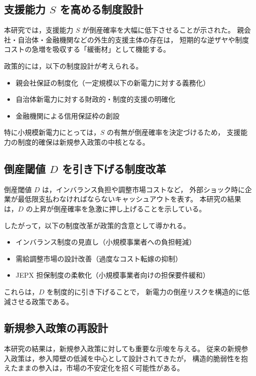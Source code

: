 \subsection{支援能力 $S$ を高める制度設計}

本研究では，支援能力 $S$ が倒産確率を大幅に低下させることが示された。
親会社・自治体・金融機関などの外生的支援主体の存在は，
短期的な逆ザヤや制度コストの急増を吸収する「緩衝材」として機能する。

政策的には，以下の制度設計が考えられる。

\begin{itemize}
    \item 親会社保証の制度化（一定規模以下の新電力に対する義務化）
    \item 自治体新電力に対する財政的・制度的支援の明確化
    \item 金融機関による信用保証枠の創設
\end{itemize}

特に小規模新電力にとっては，$S$ の有無が倒産確率を決定づけるため，
支援能力の制度的確保は新規参入政策の中核となる。

\subsection{倒産閾値 $D$ を引き下げる制度改革}

倒産閾値 $D$ は，インバランス負担や調整市場コストなど，
外部ショック時に企業が最低限支払わなければならないキャッシュアウトを表す。
本研究の結果は，$D$ の上昇が倒産確率を急激に押し上げることを示している。

したがって，以下の制度改革が政策的含意として導かれる。

\begin{itemize}
    \item インバランス制度の見直し（小規模事業者への負担軽減）
    \item 需給調整市場の設計改善（過度なコスト転嫁の抑制）
    \item JEPX 担保制度の柔軟化（小規模事業者向けの担保要件緩和）
\end{itemize}

これらは，$D$ を制度的に引き下げることで，
新電力の倒産リスクを構造的に低減させる政策である。

\subsection{新規参入政策の再設計}

本研究の結果は，新規参入政策に対しても重要な示唆を与える。
従来の新規参入政策は，参入障壁の低減を中心として設計されてきたが，
構造的脆弱性を抱えたままの参入は，市場の不安定化を招く可能性がある。

